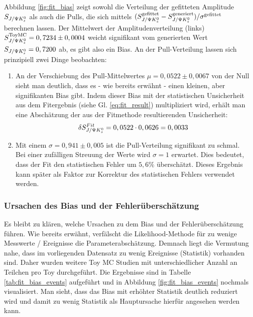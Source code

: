 Abbildung \ref{fig:fit_bias} zeigt sowohl die Verteilung der gefitteten Amplitude $S_{J/\Psi K_s^0}$ als auch die Pulls, die sich mittels $(S_{J/\Psi K_s^0}^{\text{gefittet}} - S_{J/\Psi K_s^0}^{\text{generiert}})/\sigma^{\text{gefittet}}$ berechnen lassen. Der Mittelwert der Amplitudenverteilung (links) $S_{J/\Psi K_s^0}^{\text{ToyMC}} = 0,7234 \pm 0,0004$ weicht signifikant vom generierten Wert $S_{J/\Psi K_s^0} = 0,7200$ ab, es gibt also ein Bias. An der Pull-Verteilung lassen sich prinzipiell zwei Dinge beobachten:
\begin{enumerate}
    \item An der Verschiebung des Pull-Mittelwertes $\mu = 0,0522 \pm 0,0067$ von der Null sieht man deutlich, dass es - wie bereits erwähnt - einen kleinen, aber signifikanten Bias gibt. Indem dieser Bias mit der statistischen Unsicherheit aus dem Fitergebnis (siehe Gl. \ref{eq:fit_result}) multipliziert wird, erhält man eine Abschätzung der aus der Fitmethode resultierenden Unsicherheit:
        \begin{align}
        \delta S_{J/\Psi K_s^0}^{Fit} = 0,0522 \cdot 0,0626 = 0,0033
        \end{align}

    \item Mit einem $\sigma = 0,941 \pm 0,005$ ist die Pull-Verteilung signifikant zu schmal. Bei einer zufälligen Streuung der Werte wird $\sigma=1$ erwartet. Dies bedeutet, dass der Fit den statistischen Fehler um $5,6\%$ überschätzt. Dieses Ergebnis kann später als Faktor zur Korrektur des statistischen Fehlers verwendet werden. 
\end{enumerate}

\subsubsection{Ursachen des Bias und der Fehlerüberschätzung}
Es bleibt zu klären, welche Ursachen zu dem Bias und der Fehlerüberschätzung führen. Wie bereits erwähnt, verfälscht die Likelihood-Methode für zu wenige Messwerte / Ereignisse die Parameterabschätzung. Demnach liegt die Vermutung nahe, dass im vorliegenden Datensatz zu wenig Ereignisse (\glqq Statistik\grqq) vorhanden sind. Daher wurden weitere Toy MC Studien mit unterschiedlicher Anzahl an Teilchen pro Toy durchgeführt. Die Ergebnisse sind in Tabelle \ref{tab:fit_bias_events} aufgeführt und in Abbildung \ref{fig:fit_bias_events} nochmals visualisiert. Man sieht, dass das Bias mit erhöhter Statistik deutlich reduziert wird und damit zu wenig Statistik als Hauptursache hierfür angesehen werden kann.

